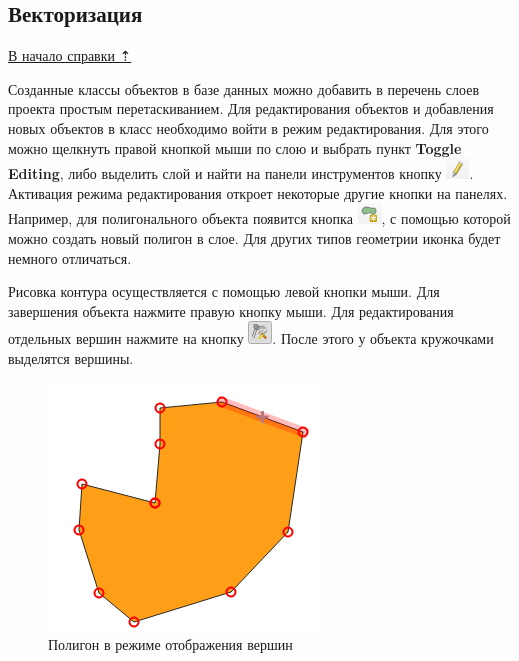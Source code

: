 \documentclass[
  12pt,
]{book}
\begin{document}
\subsection{Векторизация}\label{practice-topo-vectorization}

\hyperref[practice-topo]{В начало справки ⇡}

Созданные классы объектов в базе данных можно добавить в перечень слоев проекта простым перетаскиванием. Для редактирования объектов и добавления новых объектов в класс необходимо войти в режим редактирования. Для этого можно щелкнуть правой кнопкой мыши по слою и выбрать пункт \textbf{Toggle Editing}, либо выделить слой и найти на панели инструментов кнопку \includegraphics{images/Practice/Edit.png}. Активация режима редактирования откроет некоторые другие кнопки на панелях. Например, для полигонального объекта появится кнопка \includegraphics{images/Practice/New_polygon.png}, с помощью которой можно создать новый полигон в слое. Для других типов геометрии иконка будет немного отличаться.

Рисовка контура осуществляется с помощью левой кнопки мыши. Для завершения объекта нажмите правую кнопку мыши. Для редактирования отдельных вершин нажмите на кнопку \includegraphics{images/Practice/Vertices.png}. После этого у объекта кружочками выделятся вершины.

\begin{figure}
\centering
\includegraphics{images/Practice/Polygon.png}
\caption{Полигон в режиме отображения вершин}
\end{figure}
\end{document}
